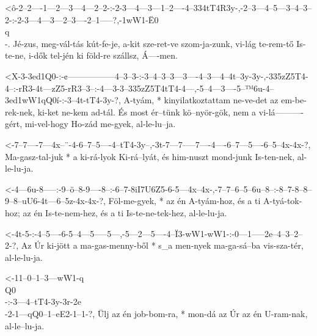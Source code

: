 

  {<ô-2--2----1---2---3---4---2--2-:-2-3---4---3---1--2----4--334tT4R3y-,-2--3---4--5---3--4--3--2-:-2-3---4---3---2--3----2--1-----?,-1wW1-Ë0\\q\\-.}
  {   Jé-zus, meg-vál-tás kút-fe-je, a-kit sze-ret-ve szom-ja-zunk,       vi-lág te-rem-tő Is-te-ne, i-dők tel-jén ki föld-re szállsz, Á----men.}

  {<X-3-3ed1Q0-:-¢-----------------4--3--3-:-3--4--3--3---3----4--3---4--4t--3y-3y-,-335zZ5T4-4--:-rR3-4t---zZ5-rR3--3--:-4---3-3--335zZ5T4tT4-4---,-5--4---3----5--™6u-4--3ed1wW1qQ0í-:-3--4t-tT4-3y-?,}
  {   A-tyám,  * kinyilatkoztattam ne-ve-det az em-be-rek-nek, ki-ket ne-kem ad-tál. És       most ér--tünk kö--nyör-gök, nem a vi-lá----------gért, mi-vel-hogy Ho-zád me-gyek,         al-le-lu--ja.}


  {<-7--7----7---4x--¨-4-6--7--5----4--tT4-3y--,-3t-7---7-----7----4----6--7---5----6--5--4x-4x-?,}
  {  Ma-gasz-tal-juk * a ki-rá-lyok Ki-rá--lyát, és him-nuszt mond-junk Is-ten-nek, al-le-lu-ja.}

  {<-4---6u-8-----:-9--ö--8-9----8--:-6--7-8iI7U6Z5-6-5---4x--4x-,-7--7--6--5--6u--8--:-8--7-8--8--9--8--uU6-4t---6--5z-4x-4x-?,}
  {  Föl-me-gyek, * az én A-tyám-hoz, és a ti       A-tyá-tok-hoz; az én Is-te-nem-hez, és a ti Is-te-ne-tek-hez, al-le-lu-ja.}


  {<-4t-5-:-4--5----6-5--4---5-----5---,-5---2---5----4--Ï3-wW1-wW1-:-0---1---–2e--4--3--2--2-?,}
  {  Az Úr  ki-jött a ma-gas-menny-ből * s_a men-nyek ma-ga-sá--ba    vis-sza-tér, al-le-lu-ja.}


  {<-11--0--1--3---wW1-q\\Q0\\-:-3---4--tT4-3y-3r-2e\\-2-1---qQ0--1--eE2-1--1-?,}
  {  Ülj az én job-bom-ra,     * mon-dá az  Úr az én   U-ram-nak, al-le--lu-ja.}

